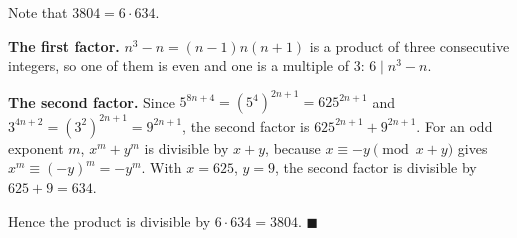 Note that $3804=6\cdot634$.

\textbf{The first factor.} $n^3-n=(n-1)n(n+1)$ is a product of three consecutive integers, so one of them is even and one is a multiple of $3$: $6\mid n^3-n$.

\textbf{The second factor.} Since $5^{8n+4}=\left(5^4\right)^{2n+1}=625^{2n+1}$ and $3^{4n+2}=\left(3^2\right)^{2n+1}=9^{2n+1}$, the second factor is $625^{2n+1}+9^{2n+1}$. For an odd exponent $m$, $x^m+y^m$ is divisible by $x+y$, because $x\equiv-y\pmod{x+y}$ gives $x^m\equiv(-y)^m=-y^m$. With $x=625$, $y=9$, the second factor is divisible by $625+9=634$.

Hence the product is divisible by $6\cdot634=3804$. $\blacksquare$
